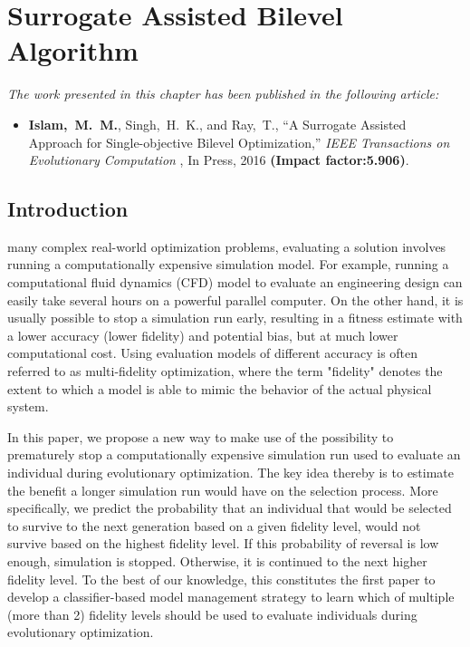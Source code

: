 \chapter{Surrogate Assisted Bilevel Algorithm}
\label{chapter_4_sabla}



\begin{tcolorbox}
\textit{The work presented in this chapter has been published in the following article:}
\small
\begin{itemize}
\item \textbf{Islam,~M.~M.}, {Singh,~H.~K.}, and {Ray,~T.}, ``A Surrogate Assisted Approach for Single-objective Bilevel Optimization,'' {\em IEEE Transactions on Evolutionary Computation }, In Press, 2016 \textbf{(Impact factor:5.906)}.
\end{itemize}
\end{tcolorbox}


\section{Introduction}
 many complex real-world optimization problems, evaluating a solution involves running a computationally expensive simulation model. For example, running a computational fluid dynamics (CFD) model to evaluate an engineering design can easily take several hours on a powerful parallel computer. On the other hand, it is usually possible to stop a simulation run early, resulting in a fitness estimate with a lower accuracy (lower fidelity) and potential bias, but at much lower computational cost. Using evaluation models of different accuracy is often referred to as multi-fidelity optimization, where the term "fidelity" denotes the extent to which a model is able to mimic the behavior of the actual physical system.

In this paper, we propose a new way to make use of the possibility to prematurely stop a computationally expensive simulation run used to evaluate an individual during evolutionary optimization. The key idea thereby is to estimate the benefit a longer simulation run would have on the selection process. More specifically, we predict the probability that an individual that would be selected to survive to the next generation based on a given fidelity level, would not survive based on the highest fidelity level. If this probability of reversal is low enough, simulation is stopped. Otherwise, it is continued to the next higher fidelity level.
To the best of our knowledge, this constitutes the first paper to develop a classifier-based model management strategy to learn which of multiple (more than 2) fidelity levels should be used to evaluate individuals during evolutionary optimization.


